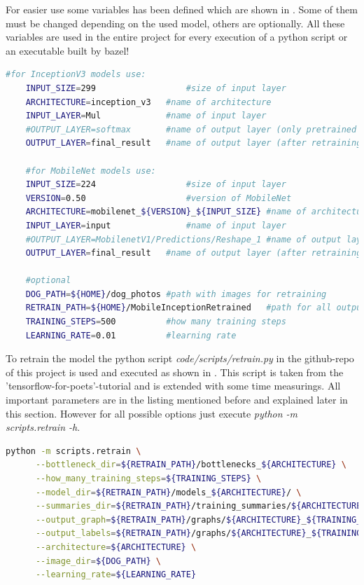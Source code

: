 For easier use some variables has been defined which are shown in . Some of them must be changed depending on the used model, others are optionally. All these variables are used in the entire project for every execution of a python script or an executable built by bazel!

\begin{minipage}{\linewidth}
\begin{lstlisting}[caption=Defining terminal variables, label=list:variables, language=bash]
	#for InceptionV3 models	use:
	INPUT_SIZE=299					#size of input layer
	ARCHITECTURE=inception_v3	#name of architecture
	INPUT_LAYER=Mul				#name of input layer
	#OUTPUT_LAYER=softmax		#name of output layer (only pretrained model)
	OUTPUT_LAYER=final_result	#name of output layer (after retraining)
	
	#for MobileNet models use:
	INPUT_SIZE=224					#size of input layer
	VERSION=0.50					#version of MobileNet
	ARCHITECTURE=mobilenet_${VERSION}_${INPUT_SIZE}	#name of architecture
	INPUT_LAYER=input	 			#name of input layer
	#OUTPUT_LAYER=MobilenetV1/Predictions/Reshape_1	#name of output layer (only pretrained model)
	OUTPUT_LAYER=final_result	#name of output layer (after retraining)
	
	#optional
	DOG_PATH=${HOME}/dog_photos	#path with images for retraining
	RETRAIN_PATH=${HOME}/MobileInceptionRetrained	#path for all output data
	TRAINING_STEPS=500			#how many training steps
	LEARNING_RATE=0.01			#learning rate
\end{lstlisting}
\end{minipage}

To retrain the model the python script \textit{code/scripts/retrain.py} in the github-repo of this project is used and executed as shown in . This script is taken from the 'tensorflow-for-poets'-tutorial and is extended with some time measurings. All important parameters are in the listing mentioned before and explained later in this section. However for all possible options just execute \textit{python -m scripts.retrain -h}. 

\begin{minipage}{\linewidth}
\begin{lstlisting}[caption=Call of \textit{retrain.py}, label=list:retrain, language=bash]
	python -m scripts.retrain \
	  --bottleneck_dir=${RETRAIN_PATH}/bottlenecks_${ARCHITECTURE} \
	  --how_many_training_steps=${TRAINING_STEPS} \
	  --model_dir=${RETRAIN_PATH}/models_${ARCHITECTURE}/ \
	  --summaries_dir=${RETRAIN_PATH}/training_summaries/${ARCHITECTURE}_${TRAINING_STEPS}/${ARCHITECTURE}_${TRAINING_STEPS}_${LEARNING_RATE} \
	  --output_graph=${RETRAIN_PATH}/graphs/${ARCHITECTURE}_${TRAINING_STEPS}/retrained_dog_graph_${ARCHITECTURE}_${TRAINING_STEPS}_${LEARNING_RATE}.pb \
	  --output_labels=${RETRAIN_PATH}/graphs/${ARCHITECTURE}_${TRAINING_STEPS}/retrained_dog_labels_${ARCHITECTURE}_${TRAINING_STEPS}_${LEARNING_RATE}.txt \
	  --architecture=${ARCHITECTURE} \
	  --image_dir=${DOG_PATH} \
	  --learning_rate=${LEARNING_RATE}
\end{lstlisting}
\end{minipage}

